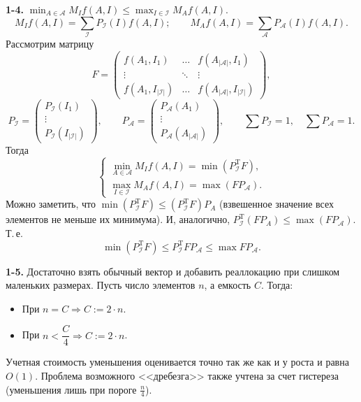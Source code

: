 \documentclass[a4paper,11pt]{article}
\begin{document}
\newpage
{\large\bfseries 1-4.}
$\displaystyle\min_{A\in\mathcal{A}}M_I f(A,I)\leq\max_{I\in\mathcal{I}}M_A f(A,I)$.
\[
	M_I f(A,I)=\sum_{\mathcal{I}}P_{\mathcal{I}}(I)f(A,I);
	\qquad M_A f(A,I)=\sum_{\mathcal{A}}P_{\mathcal{A}}(I)f(A,I).
\]
Рассмотрим матрицу
\[
	F=\begin{pmatrix}
		f(A_1,I_1)               & \dots  & f(A_{|\mathcal{A}|},I_1)               \\
		\vdots                   & \ddots & \vdots                                 \\
		f(A_1,I_{|\mathcal{I}|}) & \dots  & f(A_{|\mathcal{A}|},I_{|\mathcal{I}|})
	\end{pmatrix},
\]
\[
	P_{\mathcal{I}}=\begin{pmatrix}P_{\mathcal{I}}(I_1)\\\vdots\\P_{\mathcal{I}}(I_{|\mathcal{I}|})\end{pmatrix},
	\qquad
	P_{\mathcal{A}}=\begin{pmatrix}P_{\mathcal{A}}(A_1)\\\vdots\\P_{\mathcal{A}}(A_{|\mathcal{A}|})\end{pmatrix},
	\qquad
	\sum P_{\mathcal{I}}=1,\quad\sum P_{\mathcal{A}}=1.
\]
Тогда
\[
	\begin{cases}
		\displaystyle\min_{A\in\mathcal{A}}M_I f(A,I)=\min\left(P_{\mathcal{I}}^{\mathrm{T}}F\right), \\[4pt]
		\displaystyle\max_{I\in\mathcal{I}}M_A f(A,I)=\max\left(FP_{\mathcal{A}}\right).
	\end{cases}
\]
Можно заметить, что $\min(P_{\mathcal{I}}^{\mathrm{T}}F)
	\leq(P_{\mathcal{I}}^{\mathrm{T}}F)P_A$
(взвешенное значение всех элементов не меньше их минимума).
И, аналогично, $P_{\mathcal{I}}^{\mathrm{T}}(FP_A)\leq\max(FP_{\mathcal{A}})$.
Т.\,е.
\[
	\min(P_{\mathcal{I}}^{\mathrm{T}}F)\leq P_{\mathcal{I}}^{\mathrm{T}}FP_{\mathcal{A}}\leq\max FP_{\mathcal{A}}.
\]

\newpage

{\large\bfseries 1-5.} Достаточно взять обычный вектор и добавить реаллокацию при слишком маленьких размерах.
Пусть число элементов $n$, а емкость $C$.
Тогда:
\begin{itemize}
	\item При $n=C\Rightarrow C:=2\cdot n$.
	\item При $n<\dfrac{C}{4}\Rightarrow C:=2\cdot n$.
\end{itemize}
Учетная стоимость уменьшения оценивается точно так же как и у роста и равна $O(1)$.
Проблема возможного <<дребезга>> также учтена за счет гистереза (уменьшения лишь при пороге $\frac{n}{4}$).
\end{document}
